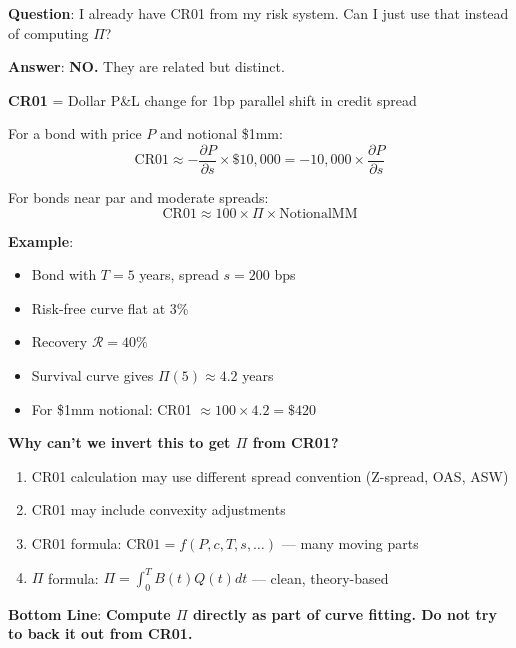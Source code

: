 \documentclass[11pt,a4paper]{article}
\begin{document}
\begin{examplebox}
\textbf{Question}: I already have CR01 from my risk system. Can I just use that instead of computing $\Pi$?

\textbf{Answer}: \textcolor{warning}{\textbf{NO.}} They are related but distinct.

\textbf{CR01} = Dollar P\&L change for 1bp parallel shift in credit spread

For a bond with price $P$ and notional \$1mm:
\begin{equation}
\text{CR01} \approx -\frac{\partial P}{\partial s} \times \$10{,}000 = -10{,}000 \times \frac{\partial P}{\partial s}
\end{equation}

For bonds near par and moderate spreads:
\begin{equation}
\text{CR01} \approx 100 \times \Pi \times \text{NotionalMM}
\end{equation}

\textbf{Example}:
\begin{itemize}
    \item Bond with $T=5$ years, spread $s=200$ bps
    \item Risk-free curve flat at 3\%
    \item Recovery $\mathcal{R}=40\%$
    \item Survival curve gives $\Pi(5) \approx 4.2$ years
    \item For \$1mm notional: CR01 $\approx 100 \times 4.2 = \$420$
\end{itemize}

\textbf{Why can't we invert this to get $\Pi$ from CR01?}

\begin{enumerate}
    \item CR01 calculation may use different spread convention (Z-spread, OAS, ASW)
    \item CR01 may include convexity adjustments
    \item CR01 formula: $\text{CR01} = f(P, c, T, s, \ldots)$ — many moving parts
    \item $\Pi$ formula: $\Pi = \int_0^T B(t)Q(t)dt$ — clean, theory-based
\end{enumerate}

\textbf{Bottom Line}: \textcolor{implementation}{\textbf{Compute $\Pi$ directly as part of curve fitting. Do not try to back it out from CR01.}}
\end{examplebox}

\end{document}

